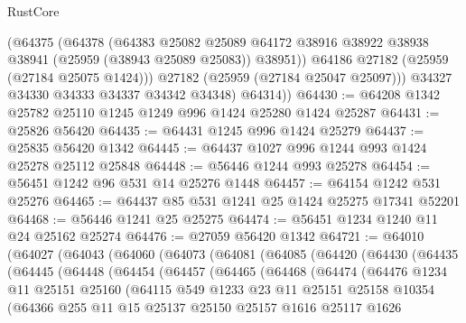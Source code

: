 \begin{lexlean}{RustCore}
\begin{coremodule}
            (@64375
              (@64378
                (@64383
                  @25082
                  @25089
                  @64172
                  @38916
                  @38922
                  @38938
                  @38941
                  (@25959 (@38943 @25089 @25083))
                  @38951))
              @64186
              @27182
              (@25959 (@27184 @25075 @1424)))
            @27182
            (@25959 (@27184 @25047 @25097)))
          @34327
          @34330
          @34333
          @34337
          @34342
          @34348)
        @64314))
@64430 := @64208 @1342 @25782 @25110 @1245 @1249 @996 @1424 @25280 @1424 @25287
@64431 := @25826 @56420
@64435 := @64431 @1245 @996 @1424 @25279
@64437 := @25835 @56420 @1342
@64445 := @64437 @1027 @996 @1244 @993 @1424 @25278 @25112 @25848
@64448 := @56446 @1244 @993 @25278
@64454 := @56451 @1242 @96 @531 @14 @25276 @1448
@64457 := @64154 @1242 @531 @25276
@64465 := @64437 @85 @531 @1241 @25 @1424 @25275 @17341 @52201
@64468 := @56446 @1241 @25 @25275
@64474 := @56451 @1234 @1240 @11 @24 @25162 @25274
@64476 := @27059 @56420 @1342
@64721 := @64010
    (@64027
      (@64043
        (@64060
          (@64073
            (@64081
              (@64085
                (@64420
                  (@64430
                    (@64435
                      (@64445
                        (@64448
                          (@64454
                            (@64457
                              (@64465
                                (@64468
                                  (@64474
                                    (@64476
                                      @1234
                                      @11
                                      @25151
                                      @25160
                                      (@64115
                                        @549
                                        @1233
                                        @23
                                        @11
                                        @25151
                                        @25158
                                        @10354
                                        (@64366
                                          @255
                                          @11
                                          @15
                                          @25137
                                          @25150
                                          @25157
                                          @1616
                                          @25117
                                          @1626

\end{coremodule}
\end{lexlean}
